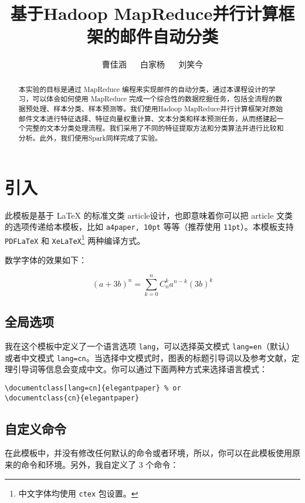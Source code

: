 \documentclass[lang=cn,11pt]{elegantpaper}
\title{基于Hadoop MapReduce并行计算框架的邮件自动分类}
\author{曹佳涵 $\quad$ 白家杨 $\quad$ 刘笑今}
\institute{2019st04小组}
\date{}
\begin{document}
\maketitle

\begin{abstract}
\noindent 本实验的目标是通过 MapReduce 编程来实现邮件的自动分类，通过本课程设计的学习，可以体会如何使用 MapReduce 完成一个综合性的数据挖掘任务，包括全流程的数据预处理、样本分类、样本预测等。我们使用Hadoop MapReduce并行计算框架对原始邮件文本进行特征选择、特征向量权重计算、文本分类和样本预测任务，从而搭建起一个完整的文本分类处理流程。我们采用了不同的特征提取方法和分类算法并进行比较和分析。此外，我们使用Spark同样完成了实验。
\end{abstract}

\section{引入}



此模板是基于 \LaTeX{} 的标准文类 article设计，也即意味着你可以把 article 文类的选项传递给本模板，比如 \lstinline{a4paper, 10pt} 等等（推荐使用 \lstinline{11pt}）。本模板支持 \lstinline{PDFLaTeX} 和 \lstinline{XeLaTeX}\footnote{中文字体均使用 \lstinline{ctex} 包设置。} 两种编译方式。

数学字体的效果如下：

\begin{equation}
(a+3b)^{n} = \sum_{k=0}^{n} C_{n}^{k} a^{n-k} (3b)^k\label{eq:binom}
\end{equation}
      
\subsection{全局选项}
我在这个模板中定义了一个语言选项 \lstinline{lang}，可以选择英文模式 \lstinline{lang=en}（默认）或者中文模式 \lstinline{lang=cn}。当选择中文模式时，图表的标题引导词以及参考文献，定理引导词等信息会变成中文。你可以通过下面两种方式来选择语言模式：

\begin{lstlisting}
\documentclass[lang=cn]{elegantpaper} % or
\documentclass{cn}{elegantpaper} 
\end{lstlisting}


\subsection{自定义命令}
在此模板中，并没有修改任何默认的命令或者环境，所以，你可以在此模板使用原来的命令和环境。另外，我自定义了 3 个命令：
\end{document}
